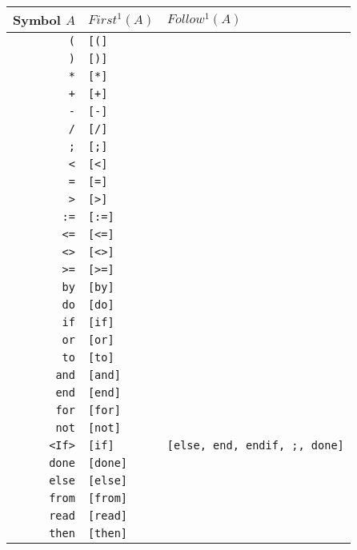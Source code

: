 \begin{longtable}{r|l|l}
Symbol $A$ & $First^1(A)$ & $Follow^1(A)$\verb## \\ \hline
\verb#(# & \verb#[(]# & \verb## \\ \hline
\verb#)# & \verb#[)]# & \verb## \\ \hline
\verb#*# & \verb#[*]# & \verb## \\ \hline
\verb#+# & \verb#[+]# & \verb## \\ \hline
\verb#-# & \verb#[-]# & \verb## \\ \hline
\verb#/# & \verb#[/]# & \verb## \\ \hline
\verb#;# & \verb#[;]# & \verb## \\ \hline
\verb#<# & \verb#[<]# & \verb## \\ \hline
\verb#=# & \verb#[=]# & \verb## \\ \hline
\verb#># & \verb#[>]# & \verb## \\ \hline
\verb#:=# & \verb#[:=]# & \verb## \\ \hline
\verb#<=# & \verb#[<=]# & \verb## \\ \hline
\verb#<># & \verb#[<>]# & \verb## \\ \hline
\verb#>=# & \verb#[>=]# & \verb## \\ \hline
\verb#by# & \verb#[by]# & \verb## \\ \hline
\verb#do# & \verb#[do]# & \verb## \\ \hline
\verb#if# & \verb#[if]# & \verb## \\ \hline
\verb#or# & \verb#[or]# & \verb## \\ \hline
\verb#to# & \verb#[to]# & \verb## \\ \hline
\verb#and# & \verb#[and]# & \verb## \\ \hline
\verb#end# & \verb#[end]# & \verb## \\ \hline
\verb#for# & \verb#[for]# & \verb## \\ \hline
\verb#not# & \verb#[not]# & \verb## \\ \hline
\verb#<If># & \verb#[if]# & \verb#[else, end, endif, ;, done]# \\ \hline
\verb#done# & \verb#[done]# & \verb## \\ \hline
\verb#else# & \verb#[else]# & \verb## \\ \hline
\verb#from# & \verb#[from]# & \verb## \\ \hline
\verb#read# & \verb#[read]# & \verb## \\ \hline
\verb#then# & \verb#[then]# & \verb## \\ \hline

\end{longtable}
